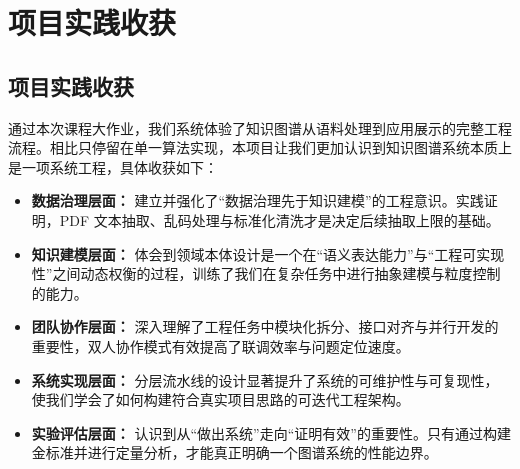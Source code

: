 \section{项目实践收获}
\subsection{项目实践收获}
通过本次课程大作业，我们系统体验了知识图谱从语料处理到应用展示的完整工程流程。相比只停留在单一算法实现，本项目让我们更加认识到知识图谱系统本质上是一项系统工程，具体收获如下：

\begin{itemize}[leftmargin=2em, itemsep=0.5ex]
    \item \textbf{数据治理层面：} 建立并强化了“数据治理先于知识建模”的工程意识。实践证明，PDF 文本抽取、乱码处理与标准化清洗才是决定后续抽取上限的基础。
    \item \textbf{知识建模层面：} 体会到领域本体设计是一个在“语义表达能力”与“工程可实现性”之间动态权衡的过程，训练了我们在复杂任务中进行抽象建模与粒度控制的能力。
    \item \textbf{团队协作层面：} 深入理解了工程任务中模块化拆分、接口对齐与并行开发的重要性，双人协作模式有效提高了联调效率与问题定位速度。
    \item \textbf{系统实现层面：} 分层流水线的设计显著提升了系统的可维护性与可复现性，使我们学会了如何构建符合真实项目思路的可迭代工程架构。
    \item \textbf{实验评估层面：} 认识到从“做出系统”走向“证明有效”的重要性。只有通过构建金标准并进行定量分析，才能真正明确一个图谱系统的性能边界。
\end{itemize}

